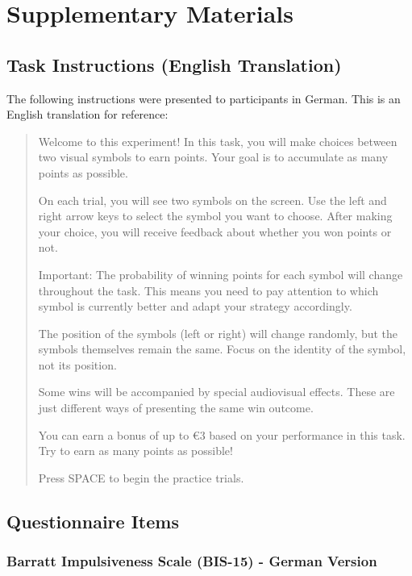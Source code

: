 

\section{Supplementary Materials}

\subsection{Task Instructions (English Translation)}

The following instructions were presented to participants in German. This is an English translation for reference:

\begin{quote}
Welcome to this experiment! In this task, you will make choices between two visual symbols to earn points. Your goal is to accumulate as many points as possible.

On each trial, you will see two symbols on the screen. Use the left and right arrow keys to select the symbol you want to choose. After making your choice, you will receive feedback about whether you won points or not.

Important: The probability of winning points for each symbol will change throughout the task. This means you need to pay attention to which symbol is currently better and adapt your strategy accordingly.

The position of the symbols (left or right) will change randomly, but the symbols themselves remain the same. Focus on the identity of the symbol, not its position.

Some wins will be accompanied by special audiovisual effects. These are just different ways of presenting the same win outcome.

You can earn a bonus of up to €3 based on your performance in this task. Try to earn as many points as possible!

Press SPACE to begin the practice trials.
\end{quote}

\subsection{Questionnaire Items}

\subsubsection{Barratt Impulsiveness Scale (BIS-15) - German Version}


